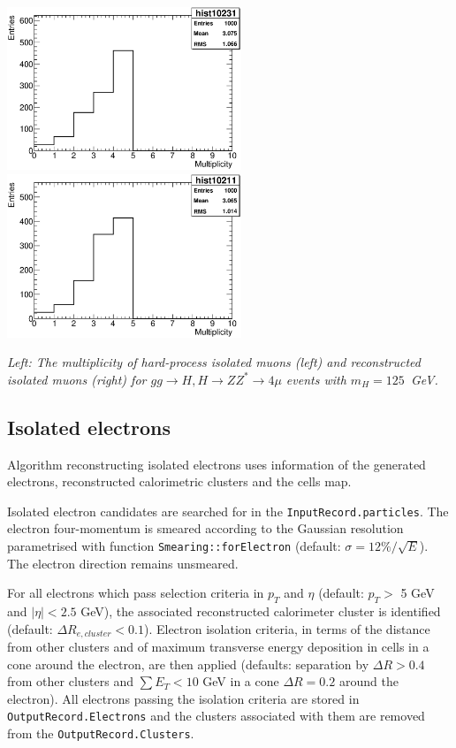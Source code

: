 \begin{Fighere}
\begin{center}
   \includegraphics[width=7.0cm,angle=0]{plot-HPisolMuons.eps}
   \includegraphics[width=7.0cm,angle=0]{plot-recoMuons.eps}
\end{center}
\caption{\em
Left: The multiplicity of  hard-process isolated muons (left) and reconstructed isolated muons (right) 
for $gg \to H, H \to ZZ^* \to 4\mu$ events with $m_H=125$~GeV.
\label{FS2.4}} 
\end{Fighere}


\boldmath 
\subsection{Isolated electrons}
\unboldmath

Algorithm reconstructing isolated electrons uses information
of the generated electrons, reconstructed calorimetric clusters and
the cells map.

Isolated electron candidates are searched for in the 
{\tt InputRecord.particles}. The electron four-momentum is
smeared according to the Gaussian resolution parametrised with
function {\tt Smearing::forElectron} (default: $\sigma = 12\%/\sqrt{E}$).
 The electron direction remains unsmeared.

For all electrons which pass selection criteria in $p_T$ and $\eta$
(default: $p_T >$ 5 GeV and $|\eta| < 2.5$ GeV), the associated 
reconstructed  calorimeter cluster is identified (default: $\Delta
R_{e, cluster} < 0.1$). Electron isolation criteria, in terms of
the distance from other clusters and of maximum transverse energy 
deposition in cells in a cone around the electron, are then applied
(defaults: separation by $\Delta R > 0.4$ from other clusters and
$\sum E_T < 10$ GeV in a cone  $\Delta R = 0.2$ around the electron).
All electrons passing the isolation criteria are stored in 
{\tt OutputRecord.Electrons} and the clusters associated with them are
removed from the {\tt  OutputRecord.Clusters}. 

